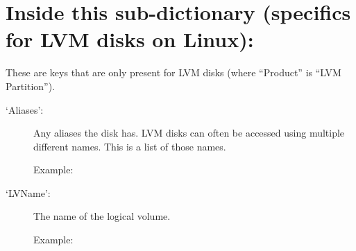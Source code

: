 \documentclass[letterpaper,10pt,english]{sphinxmanual}
\begin{document}
\section{Inside this sub-dictionary (specifics for LVM disks on Linux):}
\label{\detokenize{format:inside-this-sub-dictionary-specifics-for-lvm-disks-on-linux}}
These are keys that are only present for LVM disks (where “Product” is “LVM Partition”).
\begin{description}
\item[{‘Aliases’:}] \leavevmode
Any aliases the disk has. LVM disks can often be accessed using multiple
different names. This is a list of those names.
\begin{description}
\item[{Example:}] \leavevmode
\begin{sphinxVerbatim}[commandchars=\\\{\}]
\PYG{p}{[}\PYG{p}{]}\PYG{p}{[}\PYG{p}{]}
\PYG{p}{[} \PYG{p}{]}
\end{sphinxVerbatim}

\end{description}

\item[{‘LVName’:}] \leavevmode
The name of the logical volume.
\begin{description}
\item[{Example:}] \leavevmode
\begin{sphinxVerbatim}[commandchars=\\\{\}]
\PYG{p}{[}\PYG{p}{]}\PYG{p}{[}\PYG{p}{]}
\end{sphinxVerbatim}

\end{description}


\end{description}
\end{document}
